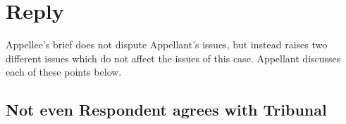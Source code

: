 \documentclass[12pt,\documentclassflag]{michiganCourtOfAppealsBrief}
\begin{document}





\section{Reply}

Appellee's brief does not dispute Appellant's issues, but instead raises two different issues which do not affect the issues of this case. Appellant discusses each of these points below.

\subsection{Not even Respondent agrees with Tribunal}
\end{document}
